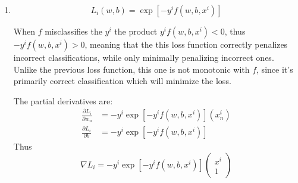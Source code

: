 \documentclass{article} %
\begin{document}
\begin{enumerate}
    The partial derivatives are:
    \begin{align*}
      \frac{\partial L_i}{\partial w_n} &=
      \exp[f(w,b,x^i) - y^i](x^i_n)\\
      \frac{\partial L_i}{\partial b} &=
      \exp[f(w,b,x^i) - y^i]
    \end{align*}
    Thus
    \[
      \nabla L_i =
      \exp[f(w,b,x^i) - y^i]
      \begin{pmatrix}
        x^i \\
        1
      \end{pmatrix}
    \]

  \item
    \[
      L_i(w,b) = \exp[-y^if(w,b,x^i)]
    \]

    When $f$ misclassifies the $y^i$ the product $y^if(w,b, x^i) <
    0$, thus $-y^if(w,b,x^i) > 0$, meaning that the this loss
    function correctly penalizes incorrect classifications, while
    only minimally penalizing incorrect ones. Unlike the previous
    loss function, this one is not monotonic with $f$, since it's
    primarily correct classification which will minimize the loss.

    The partial derivatives are:
    \begin{align*}
      \frac{\partial L_i}{\partial w_n} &=
      -y^i\exp[-y^if(w,b,x^i)](x^i_n)\\
      \frac{\partial L_i}{\partial b} &=
      -y^i\exp[-y^if(w,b,x^i)]
    \end{align*}
    Thus
    \[
      \nabla L_i =
      -y^i\exp[-y^if(w,b,x^i)]
      \begin{pmatrix}
        x^i \\
        1
      \end{pmatrix}
    \]
\end{enumerate}
\end{document}
